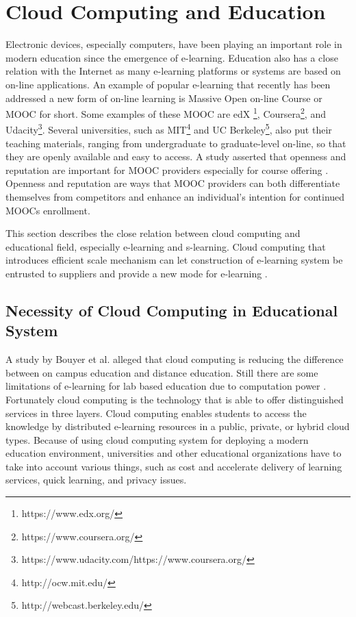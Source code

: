 \documentclass[journal]{vgtc}
\begin{document}
\section{Cloud Computing and Education}
Electronic devices, especially computers, have been playing an important role in modern education since the emergence of e-learning. Education also has a close relation with the Internet as many e-learning platforms or systems are based on on-line applications. An example of popular e-learning that recently has been addressed a new form of on-line learning is Massive Open on-line Course or MOOC for short\cite{Margaryan2014}. Some examples of these MOOC are edX \footnote{https://www.edx.org/}, Coursera\footnote{https://www.coursera.org/}, and Udacity\footnote{https://www.udacity.com/https://www.coursera.org/}. Several universities, such as MIT\footnote{http://ocw.mit.edu/} and UC Berkeley\footnote{http://webcast.berkeley.edu/}, also put their teaching materials, ranging from undergraduate to graduate-level on-line, so that they are openly available and easy to access. A study asserted that openness and reputation are important for MOOC providers especially for course offering \cite{Alraimi2014}. Openness and reputation are ways that MOOC providers can both differentiate themselves from competitors and enhance an individual's intention for continued MOOCs enrollment.

This section describes the close relation between cloud computing and educational field, especially e-learning and s-learning. Cloud computing that introduces efficient scale mechanism can let construction of e-learning system be entrusted to suppliers and provide a new mode for e-learning \cite{Laisheng2011}.

  \subsection{Necessity of Cloud Computing in Educational System}
  A study by Bouyer et al. \cite{Bouyer2014} alleged that cloud computing is reducing the difference between on campus education and distance education. Still there are some limitations of e-learning for lab based education due to computation power \cite{Bouyer2014}. Fortunately cloud computing is the technology that is able to offer distinguished services in three layers. Cloud computing enables students to access the knowledge by distributed e-learning resources in a public, private, or hybrid cloud types. Because of using cloud computing system for deploying a modern education environment, universities and other educational organizations have to take into account various things, such as cost and accelerate delivery of learning services, quick learning, and privacy issues.
\end{document}
